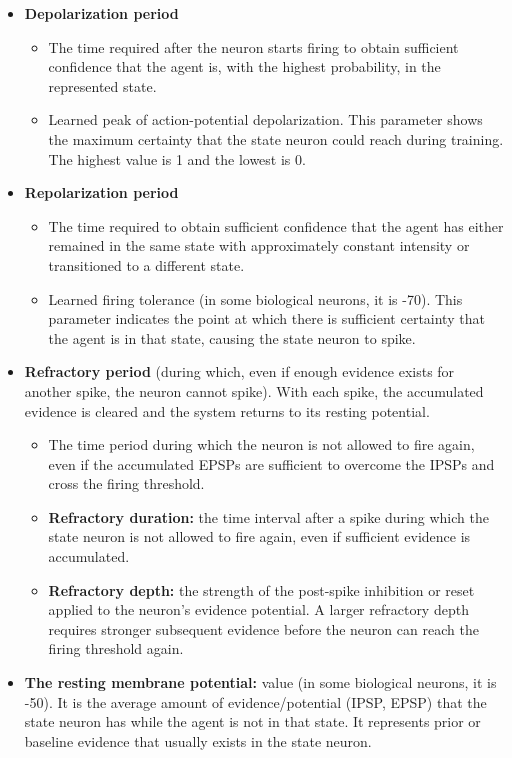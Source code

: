 \documentclass[a4paper]{article}
\begin{document}
         \begin{itemize}
            \item \textbf{Depolarization period}
            \begin{itemize}
               \item The time required after the neuron starts firing to obtain sufficient confidence that the agent is, with the highest probability, in the represented state.
               \item Learned peak of action-potential depolarization. This parameter shows the maximum certainty that the state neuron could reach during training. The highest value is 1 and the lowest is 0.
            \end{itemize}
            \item \textbf{Repolarization period}
            \begin{itemize}
               \item The time required to obtain sufficient confidence that the agent has either remained in the same state with approximately constant intensity or transitioned to a different state.
               \item Learned firing tolerance (in some biological neurons, it is -70). This parameter indicates the point at which there is sufficient certainty that the agent is in that state, causing the state neuron to spike.
            \end{itemize}
            \item \textbf{Refractory period} (during which, even if enough evidence exists for another spike, the neuron cannot spike). With each spike, the accumulated evidence is cleared and the system returns to its resting potential.
            \begin{itemize}
               \item The time period during which the neuron is not allowed to fire again, even if the accumulated EPSPs are sufficient to overcome the IPSPs and cross the firing threshold.
               \item \textbf{Refractory duration:} the time interval after a spike during which the state neuron is not allowed to fire again, even if sufficient evidence is accumulated.
               \item \textbf{Refractory depth:} the strength of the post-spike inhibition or reset applied to the neuron's evidence potential. A larger refractory depth requires stronger subsequent evidence before the neuron can reach the firing threshold again.
            \end{itemize}
            \item \textbf{The resting membrane potential:} value (in some biological neurons, it is -50). It is the average amount of evidence/potential (IPSP, EPSP) that the state neuron has while the agent is not in that state. It represents prior or baseline evidence that usually exists in the state neuron.
         \end{itemize}
\end{document}
